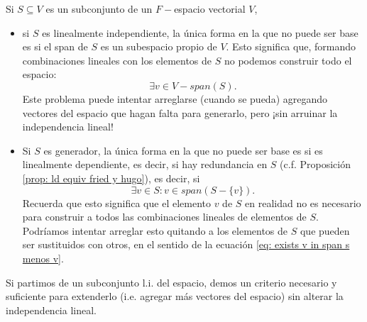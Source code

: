 Si $S \subseteq V$ es un subconjunto de un $F-$espacio vectorial $V$,
\begin{itemize}
	\item si  
	$S$ es linealmente independiente, la única forma en la que no
	puede ser base es si el span de $S$ es un subespacio propio de $V$.
	Esto significa que, formando combinaciones lineales con los elementos de $S$
	no podemos construir todo el espacio:
	\[
	\exists v \in V - span(S).
	\]
	Este problema puede intentar arreglarse (cuando se pueda) agregando
	vectores del espacio que hagan falta para generarlo, pero 
	¡sin arruinar la independencia lineal!
	\item Si $S$ es generador, la única forma en la que no puede ser base es si
	es linealmente dependiente, es decir, si hay redundancia en $S$
	(c.f. Proposición \ref{prop: ld equiv fried y hugo}), es decir, 
	si
	\begin{equation}
		\label{eq: exists v in span s menos v}
		\exists v \in S: v \in span(S-\{ v \}). 
	\end{equation}
	Recuerda que esto significa que el elemento $v$ de $S$ en realidad
	no es necesario para construir a todos las combinaciones lineales
	de elementos de $S$. Podríamos intentar arreglar esto quitando a los
	elementos de $S$ que pueden ser sustituidos con otros, en el sentido
	de la ecuación 
	\eqref{eq: exists v in span s menos v}.
\end{itemize}

Si partimos de un subconjunto l.i. del espacio, demos un criterio
necesario y suficiente para 
extenderlo (i.e. agregar más vectores del espacio) sin alterar 
la independencia lineal.

